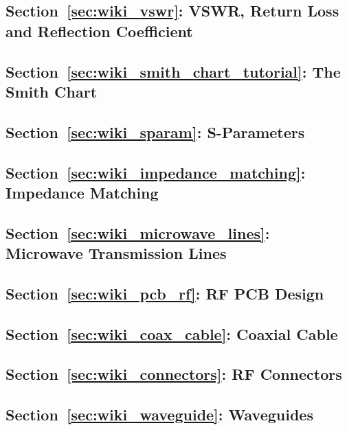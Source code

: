 
\subsection*{Section~\ref{sec:wiki_vswr}: VSWR, Return Loss and Reflection Coefficient}

\subsection*{Section~\ref{sec:wiki_smith_chart_tutorial}: The Smith Chart}

\subsection*{Section~\ref{sec:wiki_sparam}: S-Parameters}

\subsection*{Section~\ref{sec:wiki_impedance_matching}: Impedance Matching}

\subsection*{Section~\ref{sec:wiki_microwave_lines}: Microwave Transmission Lines}

\subsection*{Section~\ref{sec:wiki_pcb_rf}: RF PCB Design}

\subsection*{Section~\ref{sec:wiki_coax_cable}: Coaxial Cable}

\subsection*{Section~\ref{sec:wiki_connectors}: RF Connectors}

\subsection*{Section~\ref{sec:wiki_waveguide}: Waveguides}
